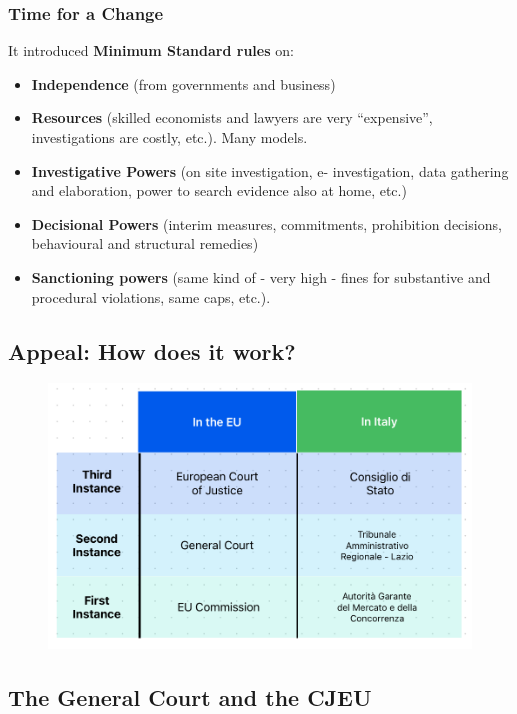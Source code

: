         \subsubsection{Time for a Change}


            It introduced \textbf{Minimum Standard rules} on:
            \begin{itemize}
                \item \textbf{Independence} (from governments and business) 
                \item \textbf{Resources} (skilled economists and lawyers are very “expensive”, investigations are costly, etc.). Many models. 
                \item \textbf{Investigative Powers} (on site investigation, e- investigation, data gathering and elaboration, power to search evidence also at home, etc.) 
                \item \textbf{Decisional Powers} (interim measures, commitments, prohibition decisions, behavioural and structural remedies) 
                \item \textbf{Sanctioning powers} (same kind of - very high - fines for substantive and procedural violations, same caps, etc.).
            \end{itemize}

\newpage
    \subsection{Appeal: How does it work?}

        \begin{figure}[h]
            \centering
            \includegraphics[width=0.65\linewidth]{graphics/L6-3_appeal.png}
        \end{figure}

    \subsection{The General Court and the CJEU}

